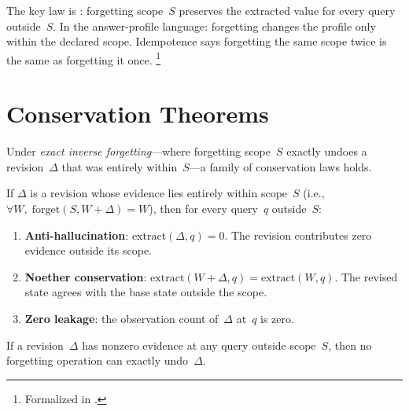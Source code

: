\documentclass[11pt,openany]{report}
\begin{document}
\noindent
The key law is : forgetting scope~$S$ preserves
the extracted value for every query outside~$S$.  In the answer-profile
language: forgetting changes the profile only within the declared scope.
Idempotence says forgetting the same scope twice is the same as
forgetting it once.%
\footnote{Formalized in
.}



\section{Conservation Theorems}
\label{sec:conservation}

Under \emph{exact inverse forgetting}---where forgetting scope~$S$
exactly undoes a revision~$\Delta$ that was entirely within~$S$---a
family of conservation laws holds.

\begin{theorem}
\label{thm:conservation}
If $\Delta$ is a revision whose evidence lies entirely within scope~$S$
(i.e., $\forall W,\; \mathrm{forget}(S, W + \Delta) = W$), then for
every query~$q$ outside~$S$:
\begin{enumerate}
\item \textbf{Anti-hallucination}: $\mathrm{extract}(\Delta, q) = 0$.
  The revision contributes zero evidence outside its scope.
\item \textbf{Noether conservation}:
  $\mathrm{extract}(W + \Delta, q) = \mathrm{extract}(W, q)$.
  The revised state agrees with the base state outside the scope.
\item \textbf{Zero leakage}: the observation count of~$\Delta$ at~$q$
  is zero.
\end{enumerate}
\end{theorem}

\begin{theorem}
If a revision~$\Delta$ has nonzero evidence at any query outside
scope~$S$, then no forgetting operation can exactly undo~$\Delta$.
\end{theorem}
\end{document}
